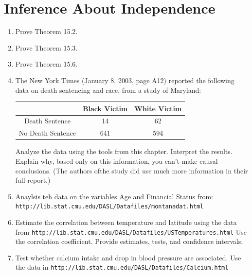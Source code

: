 \documentclass{article}
\begin{document}
\section{Inference About Independence}
\begin{enumerate}
	\item Prove Theorem 15.2.
	\item Prove Theorem 15.3.
	\item Prove Theorem 15.6.
	\item The New York Times (January 8, 2003, page A12) reported the following data on death sentencing and race, from a study of Maryland:
	\begin{center}
		\begin{tabular}{|c|c|c|}
			\hline
			& Black Victim & White Victim \\
			\hline
			Death Sentence & 14 & 62 \\
			\hline
			No Death Sentence & 641 & 594 \\
			\hline
		\end{tabular}
	\end{center}
	Analyze the data using the tools from this chapter. Interpret the results. Explain why, based only on this information, you can't make causal conclusions. (The authors ofthe study did use much more information in their full report.)
	\item Anaylsis teh data on the variables Age and Financial Status from:
	\texttt{http://lib.stat.cmu.edu/DASL/Datafiles/montanadat.html}
	\item Estimate the correlation between temperature and latitude using the data from
	\texttt{http://lib.stat.cmu.edu/DASL/Datafiles/USTemperatures.html}
	Use the correlation coefficient. Provide estimates, tests, and confidence intervals.
	\item Test whether calcium intake and drop in blood pressure are associated. Use the data in
	\texttt{http://lib.stat.cmu.edu/DASL/Datafiles/Calcium.html}
\end{enumerate}
\end{document}
